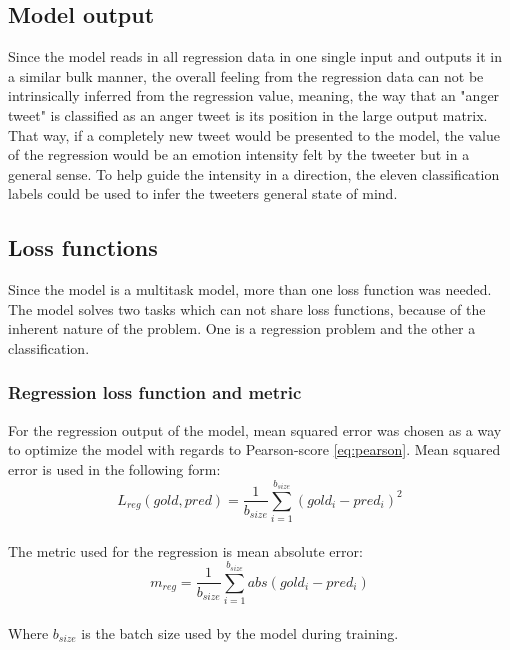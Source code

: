\subsection{Model output}
Since the model reads in all regression data in one single input and outputs it in a similar bulk manner, the overall feeling from the regression data can not be intrinsically inferred from the regression value, meaning, the way that an "anger tweet" is classified as an anger tweet is its position in the large output matrix. That way, if a completely new tweet would be presented to the model, the value of the regression would be an emotion intensity felt by the tweeter but in a general sense. To help guide the intensity in a direction, the eleven classification labels could be used to infer the tweeters general state of mind. 

\subsection{Loss functions}
Since the model is a multitask model, more than one loss function was needed. The model solves two tasks which can not share loss functions, because of the inherent nature of the problem. One is a regression problem and the other a classification.

\subsubsection{Regression loss function and metric}
For the regression output of the model, mean squared error was chosen as a way to optimize the model with regards to Pearson-score \ref{eq:pearson}. Mean squared error is used in the following form:\\
\begin{equation} \label{eq:lreg}
L_{reg}(gold, pred)=\dfrac{1}{b_{size}}\sum^{b_{size}}_{i=1}\left(gold_{i}-pred_{i}\right)^{2}
\end{equation}\\
The metric used for the regression is mean absolute error:\\
\begin{equation} \label{eq:meanabs}
m_{reg}=\dfrac{1}{b_{size}}\sum^{b_{size}}_{i=1}abs\left(gold_{i}-pred_{i}\right)
\end{equation}\\
Where $b_{size}$ is the batch size used by the model during training. 

